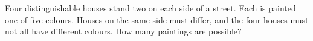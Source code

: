 Four distinguishable houses stand two on each side of a street. Each is painted one of five colours. Houses on the same side must differ, and the four houses must not all have different colours. How many paintings are possible?
